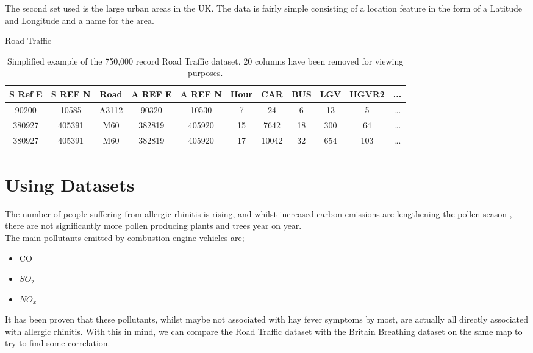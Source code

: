 The second set used is the large urban areas in the UK. The data is fairly simple consisting of a location feature in the form of a Latitude and Longitude and a name for the area.\\


\begin{table}
\begin{center}
Road Traffic\\
\begin{tabular}{|c|c|c|c|c|c|c|c|c|c|c|}\hline\hline
S Ref E&S REF N&Road&A REF E&A REF N&Hour&CAR&BUS&LGV&HGVR2&...\\\hline
90200&10585&A3112&90320&10530&7&24&6&13&5&...\\
380927&405391&M60&382819&405920&15&7642&18&300&64&...\\
380927&405391&M60&382819&405920&17&10042&32&654&103&...\\\hline\hline
\end{tabular}

\caption{Simplified example of the 750,000 record Road Traffic dataset. 20 columns have been removed for viewing purposes.}\label{RoadTrafficData}
\end{center}
\end{table}

\section{Using Datasets}

The number of people suffering from allergic rhinitis is rising\cite{allergyrising}, and whilst increased carbon emissions are lengthening the pollen season \cite{co2pollen}, there are not significantly more pollen producing plants and trees year on year.\\

The main pollutants emitted by combustion engine vehicles are;\cite{vehcemis}

\begin{itemize}
    \item CO
    \item $SO_2$
    \item $NO_x$
\end{itemize}

It has been proven that these pollutants, whilst maybe not associated with hay fever symptoms by most, are actually all directly associated with allergic rhinitis\cite{airPollution}. With this in mind, we can compare the Road Traffic dataset with the Britain Breathing dataset on the same map to try to find some correlation.\\

